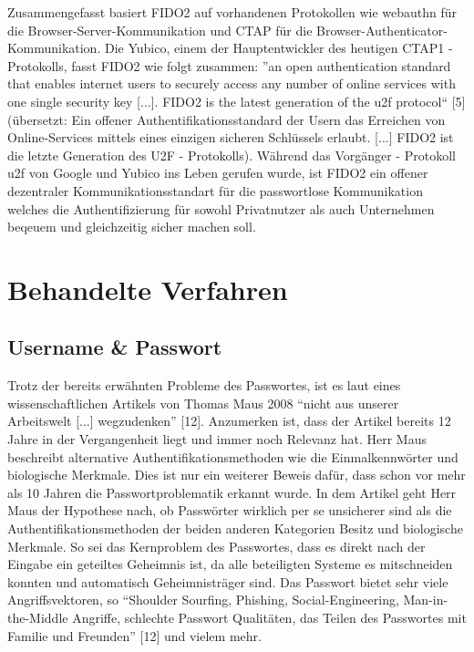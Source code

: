 Zusammengefasst basiert FIDO2 auf vorhandenen Protokollen wie \ac{webauthn} für die Browser-Server-Kommunikation und CTAP für die Browser-Authenticator-Kommunikation. Die Yubico, einem der Hauptentwickler des heutigen CTAP1 - Protokolls, fasst FIDO2 wie folgt zusammen: ''an open authentication standard that enables internet users to securely access any number of online services with one single security key [...]. FIDO2 is the latest generation of the \ac{u2f} protocol`` [5] (übersetzt: Ein offener Authentifikationsstandard der Usern das Erreichen von Online-Services mittels eines einzigen sicheren Schlüssels erlaubt. [...] FIDO2 ist die letzte Generation des U2F - Protokolls). Während das Vorgänger - Protokoll \ac{u2f} von Google und Yubico ins Leben gerufen wurde, ist FIDO2 ein offener dezentraler Kommunikationsstandart für die passwortlose Kommunikation welches die Authentifizierung für sowohl Privatnutzer als auch Unternehmen beqeuem und gleichzeitig sicher machen soll.
\newpage

\section{Behandelte Verfahren}
\subsection{Username \& Passwort}
Trotz der bereits erwähnten Probleme des Passwortes, ist es laut eines wissenschaftlichen Artikels von Thomas Maus 2008 ``nicht aus unserer Arbeitswelt [...] wegzudenken'' [12]. Anzumerken ist, dass der Artikel bereits 12 Jahre in der Vergangenheit liegt und immer noch Relevanz hat. Herr Maus beschreibt alternative Authentifikationsmethoden wie die Einmalkennwörter und biologische Merkmale. Dies ist nur ein weiterer Beweis dafür, dass schon vor mehr als 10 Jahren die Passwortproblematik erkannt wurde. In dem Artikel geht Herr Maus der Hypothese nach, ob Passwörter wirklich per se unsicherer sind als die Authentifikationsmethoden der beiden anderen Kategorien Besitz und biologische Merkmale. So sei das Kernproblem des Passwortes, dass es direkt nach der Eingabe ein geteiltes Geheimnis ist, da alle beteiligten Systeme es mitschneiden konnten und automatisch Geheimnisträger sind. Das Passwort bietet sehr viele Angriffsvektoren, so ``Shoulder Sourfing, Phishing, Social-Engineering, Man-in-the-Middle Angriffe, schlechte Passwort Qualitäten, das Teilen des Passwortes mit Familie und Freunden'' [12] und vielem mehr.


